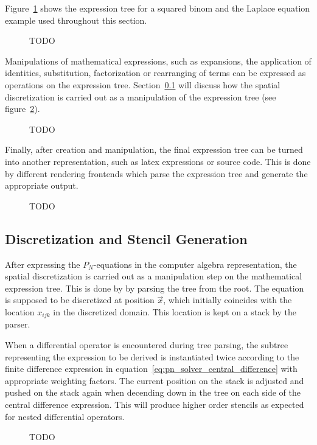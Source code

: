 Figure~\ref{fig:pn_math_expression_tree} shows the expression tree for a squared binom and the Laplace equation example used throughout this section.
\begin{figure}[h]
\centering
{}
\caption{TODO}
\label{fig:pn_math_expression_tree}
\end{figure}

Manipulations of mathematical expressions, such as expansions, the application of identities, substitution, factorization or rearranging of terms can be expressed as operations on the expression tree. Section~\ref{sec:pn_stencil_gen} will discuss how the spatial discretization is carried out as a manipulation of the expression tree (see figure~\ref{fig:pn_math_expression_tree_manipulation}).
\begin{figure}[h]
\centering
{}
\caption{TODO}
\label{fig:pn_math_expression_tree_manipulation}
\end{figure}

Finally, after creation and manipulation, the final expression tree can be turned into another representation, such as latex expressions or source code. This is done by different rendering frontends which parse the expression tree and generate the appropriate output.
\begin{figure}[h]
\centering
{}
\caption{TODO}
\label{fig:pn_math_expression_tree_rendering}
\end{figure}

\subsection{Discretization and Stencil Generation}
\label{sec:pn_stencil_gen}

After expressing the $P_N$-equations in the computer algebra representation, the spatial discretization is carried out as a manipulation step on the mathematical expression tree. This is done by by parsing the tree from the root. The equation is supposed to be discretized at position $\vec{x}$, which initially coincides with the location $x_{ijk}$ in the discretized domain. This location is kept on a stack by the parser.

When a differential operator is encountered during tree parsing, the subtree representing the expression to be derived is instantiated twice according to the finite difference expression in equation~\ref{eq:pn_solver_central_difference} with appropriate weighting factors. The current position on the stack is adjusted and pushed on the stack again when decending down in the tree on each side of the central difference expression. This will produce higher order stencils as expected for nested differential operators.
\begin{figure}[h]
\centering
{}
\caption{TODO}
\label{fig:pn_discretization_differential}
\end{figure}

